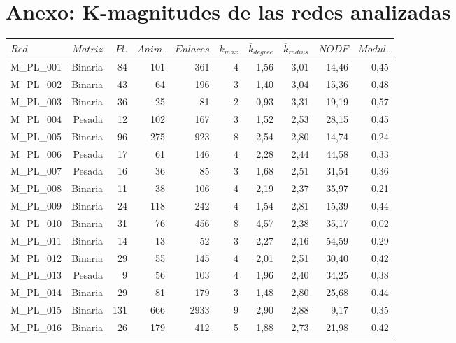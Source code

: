 \section{Anexo: K-magnitudes de las redes analizadas}
\label{ESTATICA_ANEXO_kmagnitudes}
\begin{table}[ht!]
\fontsize{2.2mm}{2.2mm}\selectfont
  \centering
    \begin{tabular}{lrrrrrrrrr}
    \toprule
    $Red$  & $Matriz$ & $Pl.$ & $Anim.$ & $Enlaces$ & $k_{max}$ & $\overline k_{degree}$ & $\overline k_{radius}$ & $NODF$ & $Modul.$ \\
    \midrule
     M\_PL\_001 & Binaria & 84   & 101  & 361  & 4    & 1,56 & 3,01 & 14,46 & 0,45 \\
    M\_PL\_002 & Binaria & 43   & 64   & 196  & 3    & 1,40 & 3,04 & 15,36 & 0,48 \\
    M\_PL\_003 & Binaria & 36   & 25   & 81   & 2    & 0,93 & 3,31 & 19,19 & 0,57 \\
    M\_PL\_004 & Pesada & 12   & 102  & 167  & 3    & 1,52 & 2,53 & 28,15 & 0,45 \\
    M\_PL\_005 & Binaria & 96   & 275  & 923  & 8    & 2,54 & 2,80 & 14,74 & 0,24 \\
    M\_PL\_006 & Pesada & 17   & 61   & 146  & 4    & 2,28 & 2,44 & 44,58 & 0,33 \\
    M\_PL\_007 & Pesada & 16   & 36   & 85   & 3    & 1,68 & 2,51 & 31,54 & 0,36 \\
    M\_PL\_008 & Binaria & 11   & 38   & 106  & 4    & 2,19 & 2,37 & 35,97 & 0,21 \\
    M\_PL\_009 & Binaria & 24   & 118  & 242  & 4    & 1,54 & 2,81 & 15,39 & 0,44 \\
    M\_PL\_010 & Binaria & 31   & 76   & 456  & 8    & 4,57 & 2,38 & 35,17 & 0,02 \\
    M\_PL\_011 & Binaria & 14   & 13   & 52   & 3    & 2,27 & 2,16 & 54,59 & 0,29 \\
    M\_PL\_012 & Binaria & 29   & 55   & 145  & 4    & 2,01 & 2,51 & 30,40 & 0,42 \\
    M\_PL\_013 & Pesada & 9    & 56   & 103  & 4    & 1,96 & 2,40 & 34,25 & 0,38 \\
    M\_PL\_014 & Binaria & 29   & 81   & 179  & 3    & 1,48 & 2,80 & 25,68 & 0,44 \\
    M\_PL\_015 & Binaria & 131  & 666  & 2933 & 9    & 2,90 & 2,88 & 9,17 & 0,35 \\
    M\_PL\_016 & Binaria & 26   & 179  & 412  & 5    & 1,88 & 2,73 & 21,98 & 0,42 \\

\end{tabular}
\end{table}
